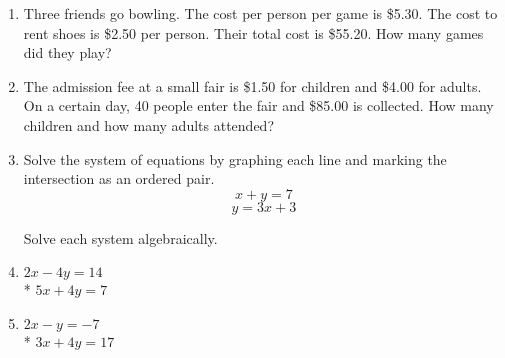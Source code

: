 \documentclass[12pt, twoside]{article}
\begin{document}
\begin{enumerate}
    \item Three friends go bowling. The cost per person per game is \$5.30. The cost to rent shoes is \$2.50 per person. Their total cost is \$55.20. How many games did they play? \vspace{6cm}
  
    \item The admission fee at a small fair is \$1.50 for children and \$4.00 for adults. On a certain day, 40 people enter the fair and \$85.00 is collected. How many children and how many adults attended?
  
\newpage
\item Solve the system of equations by graphing each line and marking the intersection as an ordered pair.
      \[x+y=7\]
      \[y=3x+3\]
  
  \begin{center} %
  \end{center}
  
  \newpage
    Solve each system algebraically.
    \item
    $2x-4y=14$\\*
    $5x+4y=7$ \vspace{6cm}
  
    \item
    $2x-y=-7$\\*
    $3x+4y=17$  \vspace{6cm}
      
      

\end{enumerate}
\end{document}
